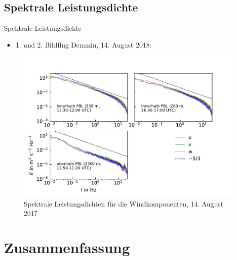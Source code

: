 \documentclass[ucs,9pt]{beamer}
\begin{document}
\subsection{Spektrale Leistungsdichte}

\begin{frame}{Spektrale Leistungsdichte}
	\begin{itemize}
		\item 1. und 2. Bildflug Demmin, 14. August 2018: 
	\end{itemize}
	\begin{figure}
		\includegraphics[width=.8\textwidth]{./docmedia/power_flights.pdf}
		\caption{Spektrale Leistungsdichten für die Windkomponenten, 14. August 2017}
	\end{figure}
\end{frame}

\section{Zusammenfassung}
\end{document}
